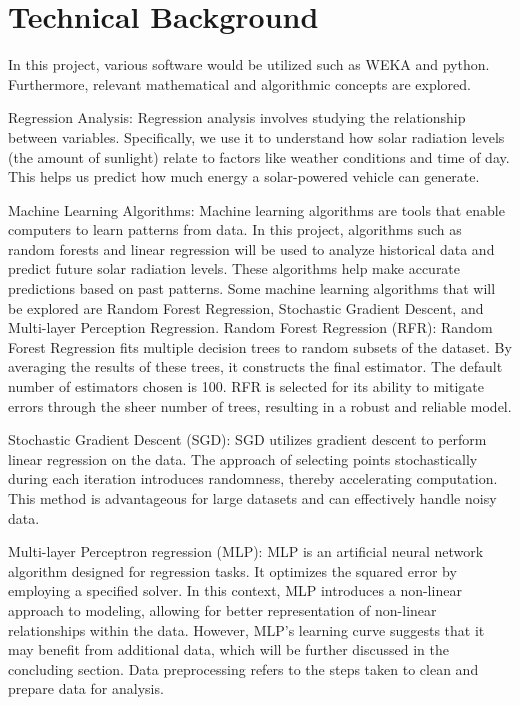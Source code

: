 \documentclass[10pt,twocolumn]{article}
\begin{document}
 

 \section{Technical Background}
 In this project, various software would be utilized such as WEKA and python. Furthermore, relevant mathematical and algorithmic concepts are explored.
 
Regression Analysis:
Regression analysis involves studying the relationship between variables. Specifically, we use it to understand how solar radiation levels (the amount of sunlight) relate to factors like weather conditions and time of day. This helps us predict how much energy a solar-powered vehicle can generate.

Machine Learning Algorithms:
Machine learning algorithms are tools that enable computers to learn patterns from data. In this project, algorithms such as random forests and linear regression will be used to analyze historical data and predict future solar radiation levels. These algorithms help make accurate predictions based on past patterns. Some machine learning algorithms that will be explored are Random Forest Regression, Stochastic Gradient Descent, and Multi-layer Perception Regression.
Random Forest Regression (RFR):
Random Forest Regression fits multiple decision trees to random subsets of the dataset. By averaging the results of these trees, it constructs the final estimator. The default number of estimators chosen is 100. RFR is selected for its ability to mitigate errors through the sheer number of trees, resulting in a robust and reliable model.

Stochastic Gradient Descent (SGD):
SGD utilizes gradient descent to perform linear regression on the data. The approach of selecting points stochastically during each iteration introduces randomness, thereby accelerating computation. This method is advantageous for large datasets and can effectively handle noisy data.

Multi-layer Perceptron regression (MLP):
MLP is an artificial neural network algorithm designed for regression tasks. It optimizes the squared error by employing a specified solver. In this context, MLP introduces a non-linear approach to modeling, allowing for better representation of non-linear relationships within the data. However, MLP's learning curve suggests that it may benefit from additional data, which will be further discussed in the concluding section.
Data preprocessing refers to the steps taken to clean and prepare data for analysis.
\end{document}
